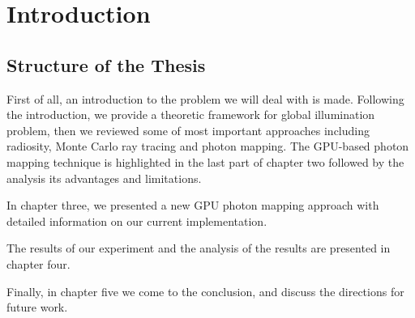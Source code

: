 \chapter{Introduction}


\section{Structure of the Thesis}	

First of all, an introduction to the problem we will deal with is made. Following the introduction, we provide a theoretic framework for global illumination problem, then we reviewed some of most important approaches including radiosity, Monte Carlo ray tracing and photon mapping. The GPU-based photon mapping technique is highlighted in the last part of chapter two followed by the analysis its advantages and limitations. 

In chapter three, we presented a new GPU photon mapping approach with detailed information on our current implementation. 

The results of our experiment and the analysis of the results are presented in chapter four. 

Finally, in chapter five we come to the conclusion, and discuss the directions for future work.